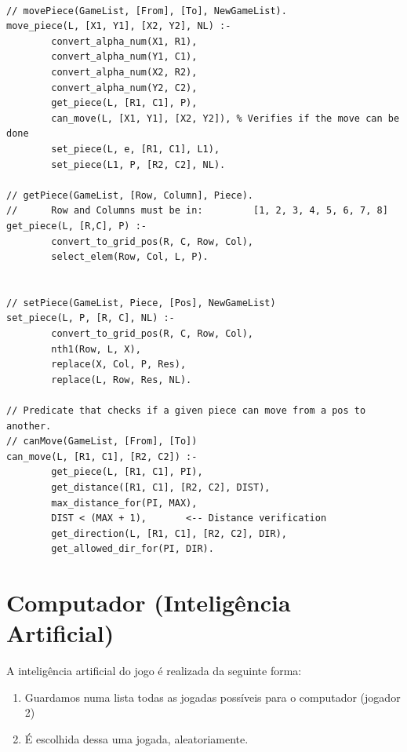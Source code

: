 \begin{lstlisting}

// movePiece(GameList, [From], [To], NewGameList).
move_piece(L, [X1, Y1], [X2, Y2], NL) :-
        convert_alpha_num(X1, R1),
        convert_alpha_num(Y1, C1),
        convert_alpha_num(X2, R2),
        convert_alpha_num(Y2, C2),
        get_piece(L, [R1, C1], P),
        can_move(L, [X1, Y1], [X2, Y2]), % Verifies if the move can be done
        set_piece(L, e, [R1, C1], L1),
        set_piece(L1, P, [R2, C2], NL).

// getPiece(GameList, [Row, Column], Piece).
//      Row and Columns must be in:         [1, 2, 3, 4, 5, 6, 7, 8]
get_piece(L, [R,C], P) :-
        convert_to_grid_pos(R, C, Row, Col),
        select_elem(Row, Col, L, P).


// setPiece(GameList, Piece, [Pos], NewGameList)
set_piece(L, P, [R, C], NL) :-
        convert_to_grid_pos(R, C, Row, Col),
        nth1(Row, L, X),
        replace(X, Col, P, Res),
        replace(L, Row, Res, NL).

// Predicate that checks if a given piece can move from a pos to another.
// canMove(GameList, [From], [To])
can_move(L, [R1, C1], [R2, C2]) :-
        get_piece(L, [R1, C1], PI),
        get_distance([R1, C1], [R2, C2], DIST),
        max_distance_for(PI, MAX),
        DIST < (MAX + 1),       <-- Distance verification
        get_direction(L, [R1, C1], [R2, C2], DIR),
        get_allowed_dir_for(PI, DIR).

\end{lstlisting}

\newpage

\section{Computador (Inteligência Artificial)}

A inteligência artificial do jogo é realizada da seguinte forma: 



\begin{enumerate}

	\item Guardamos numa lista todas as jogadas possíveis para o computador (jogador 2)

	\item É escolhida dessa uma jogada, aleatoriamente. 

\end{enumerate}





